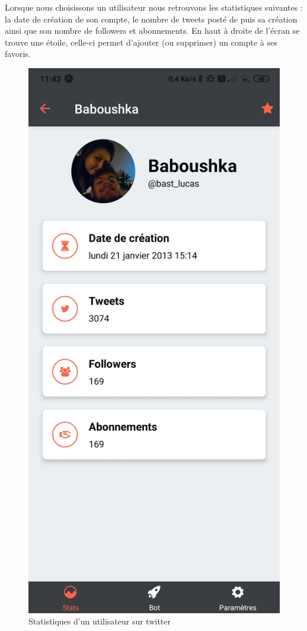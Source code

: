 \documentclass{article}
\begin{document}
\newline\newline
Lorsque nous choisissons un utilisateur nous retrouvons les statistiques suivantes : la date de création de son compte, le nombre de tweets posté de puis sa création ainsi que son nombre de followers et abonnements. En haut à droite de l'écran se trouve une étoile, celle-ci permet d'ajouter (ou supprimer) un compte à ses favoris.

\begin{figure}[h!]
\centering
\includegraphics[scale=0.1]{images/stats_user.jpg}
\caption{Statistiques d'un utilisateur sur twitter}
\label{fig:Statistiques d'un utilisateur sur twitter}
\end{figure}




\end{document}
